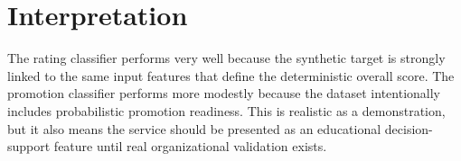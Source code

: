 \section{Interpretation}
The rating classifier performs very well because the synthetic target is strongly linked to the same input features that define the deterministic overall score. The promotion classifier performs more modestly because the dataset intentionally includes probabilistic promotion readiness. This is realistic as a demonstration, but it also means the service should be presented as an educational decision-support feature until real organizational validation exists.
